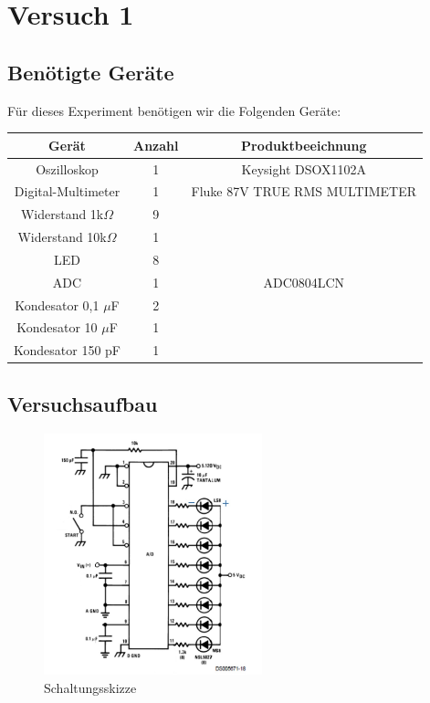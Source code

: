 \chapter{Versuch 1}

\section{Benötigte Geräte}

Für dieses Experiment benötigen wir die Folgenden Geräte:

\begin{tabular}[h]{c|c|c}
    Gerät & Anzahl & Produktbeeichnung\\
    \hline
    Oszilloskop & 1  & Keysight DSOX1102A\\
    \hline
	Digital-Multimeter & 1 & Fluke 87V TRUE RMS MULTIMETER\\
	\hline 
	Widerstand 1k$\Omega$ & 9 &  \\
	\hline 
	Widerstand 10k$\Omega$ & 1 &  \\
	\hline
	LED & 8 & \\
	\hline
	ADC & 1 & ADC0804LCN \\
	\hline
	Kondesator 0,1 $\mu$F & 2 & \\
	\hline
	Kondesator 10 $\mu$F & 1 & \\
	\hline
	Kondesator 150 pF & 1 & 
        \label{tab:Materialliste Versuch 1}
\end{tabular}

\section{Versuchsaufbau}


\begin{figure}[H]
	\centering
	\includegraphics[height=7cm]{images/Schaltungsskizze-versuch-eins.jpg} 
	\caption[]{Schaltungsskizze}
	\label{fig: Schaltungsskizze}
\end{figure}

